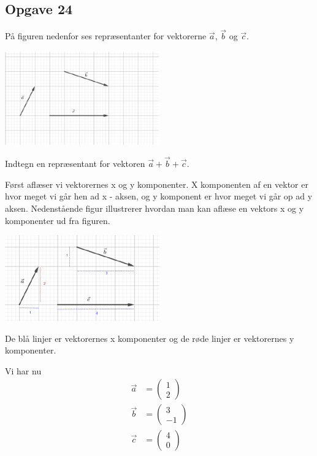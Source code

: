 \subsection{Opgave 24}

På figuren nedenfor ses repræsentanter for vektorerne $\vec{a}$, $\vec{b}$ og $\vec{c}$.

\includegraphics[width = 0.5\textwidth]{Opgave_21-30/Opgave_24/24.png}

Indtegn en repræsentant for vektoren $\vec{a} + \vec{b} + \vec{c}$.

\ans

Først aflæser vi vektorernes x og y komponenter. X komponenten af en vektor er hvor meget vi går hen ad x - aksen, og y komponent er hvor meget vi går op ad y aksen. Nedenstående figur illustrerer hvordan man kan aflæse en vektors x og y komponenter ud fra figuren. 

\includegraphics[width = 0.5\textwidth]{Opgave_21-30/Opgave_24/24.1.png}

De blå linjer er vektorernes x komponenter og de røde linjer er vektorernes y komponenter.

Vi har nu
\begin{align*}
    \Vec{a} &= \begin{pmatrix} 1 \\ 2 \end{pmatrix}\\
    \Vec{b} &= \begin{pmatrix} 3 \\ -1 \end{pmatrix}\\
    \Vec{c} &= \begin{pmatrix} 4 \\ 0 \end{pmatrix}
\end{align*}

